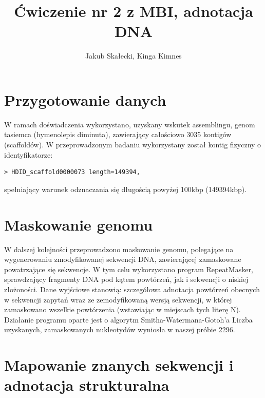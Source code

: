 \documentclass[a4paper]{article}
\begin{document}
\title{Ćwiczenie nr 2 z MBI, adnotacja DNA}
\author{Jakub Skałecki, Kinga Kimnes}
\maketitle

\section{Przygotowanie danych}
W ramach doświadczenia wykorzystano, uzyskany wskutek assemblingu, genom tasiemca (hymenolepis diminuta), zawierający całościowo 3035 kontigów (scaffoldów). W przeprowadzonym badaniu wykorzystany został kontig fizyczny o identyfikatorze:
\begin{verbatim}
> HDID_scaffold0000073 length=149394,
\end{verbatim}
spełniający warunek odznaczania się długością powyżej 100kbp (149394kbp).

\section{Maskowanie genomu}

W dalszej kolejności przeprowadzono maskowanie genomu, polegające na wygenerowaniu zmodyfikowanej sekwencji DNA, zawierającej zamaskowane powatrzające się sekwencje.
W tym celu wykorzystano program RepeatMasker, sprawdzający fragmenty DNA pod kątem powtórzeń, jak i sekwencji o niskiej złożoności. Dane wyjściowe stanowią: szczegółowa adnotacja powtórzeń obecnych w sekwencji zapytań wraz ze zemodyfikowaną wersją sekwencji, w której zamaskowano wszelkie powtórzenia (wstawiając w miejscach tych literę N). Działanie programu oparte jest o algorytm Smitha-Watermana-Gotoh'a
Liczba uzyskanych, zamaskowanych nukleotydów wyniosła w naszej próbie 2296.

\section{Mapowanie znanych sekwencji i adnotacja strukturalna}
\end{document}
